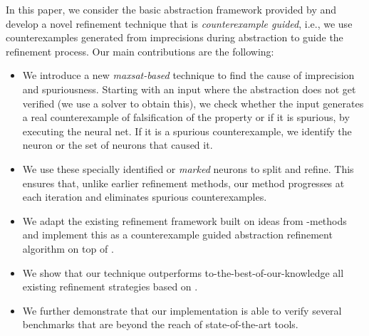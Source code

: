 
In this paper, we consider the basic abstraction framework provided by \deeppoly{} and develop a novel refinement technique that is {\em counterexample guided}, i.e., we use counterexamples generated from imprecisions during abstraction to guide the refinement process. Our main contributions are the following:
\begin{itemize}
\item We introduce a new {\em maxsat-based} technique to find the cause of imprecision and spuriousness. Starting with an input where the abstraction does not get verified (we use a \milp{} solver to obtain this), we check whether the input generates a real counterexample of falsification of the property or if it is spurious, by executing the neural net. If it is a spurious counterexample, we identify the neuron or the set of neurons that caused it.  
\item We use these specially identified or {\em marked} neurons to split and refine. This ensures that, unlike earlier refinement methods, our method progresses at each iteration and eliminates spurious counterexamples.
\item We adapt the existing refinement framework built on ideas from \milp{}-methods and implement this as a counterexample guided abstraction refinement algorithm on top of \deeppoly{}.
\item We show that our technique outperforms to-the-best-of-our-knowledge all existing refinement strategies based on \deeppoly{}.
\item We further demonstrate that our implementation is able to verify several benchmarks that are beyond the reach of state-of-the-art tools. 
\end{itemize}

